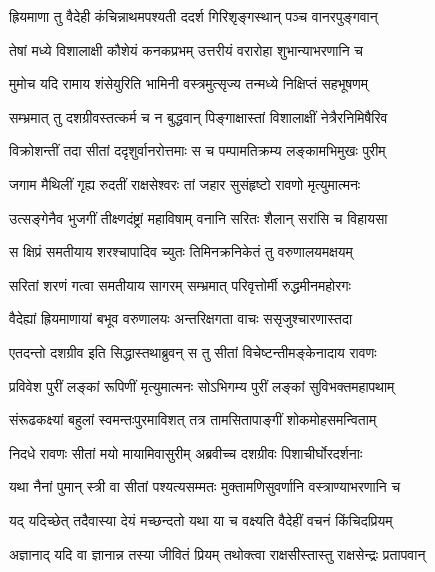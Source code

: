 
\twolineshloka
{ह्रियमाणा तु वैदेही कंचिन्नाथमपश्यती}
{ददर्श गिरिशृङ्गस्थान् पञ्च वानरपुङ्गवान्} %

\twolineshloka
{तेषां मध्ये विशालाक्षी कौशेयं कनकप्रभम्}
{उत्तरीयं वरारोहा शुभान्याभरणानि च} %

\twolineshloka
{मुमोच यदि रामाय शंसेयुरिति भामिनी}
{वस्त्रमुत्सृज्य तन्मध्ये निक्षिप्तं सहभूषणम्} %

\twolineshloka
{सम्भ्रमात् तु दशग्रीवस्तत्कर्म च न बुद्धवान्}
{पिङ्गाक्षास्तां विशालाक्षीं नेत्रैरनिमिषैरिव} %

\twolineshloka
{विक्रोशन्तीं तदा सीतां ददृशुर्वानरोत्तमाः}
{स च पम्पामतिक्रम्य लङ्कामभिमुखः पुरीम्} %

\twolineshloka
{जगाम मैथिलीं गृह्य रुदतीं राक्षसेश्वरः}
{तां जहार सुसंहृष्टो रावणो मृत्युमात्मनः} %

\twolineshloka
{उत्सङ्गेनैव भुजगीं तीक्ष्णदंष्ट्रां महाविषाम्}
{वनानि सरितः शैलान् सरांसि च विहायसा} %

\twolineshloka
{स क्षिप्रं समतीयाय शरश्चापादिव च्युतः}
{तिमिनक्रनिकेतं तु वरुणालयमक्षयम्} %

\twolineshloka
{सरितां शरणं गत्वा समतीयाय सागरम्}
{सम्भ्रमात् परिवृत्तोर्मी रुद्धमीनमहोरगः} %

\twolineshloka
{वैदेह्यां ह्रियमाणायां बभूव वरुणालयः}
{अन्तरिक्षगता वाचः ससृजुश्चारणास्तदा} %

\twolineshloka
{एतदन्तो दशग्रीव इति सिद्धास्तथाब्रुवन्}
{स तु सीतां विचेष्टन्तीमङ्केनादाय रावणः} %

\twolineshloka
{प्रविवेश पुरीं लङ्कां रूपिणीं मृत्युमात्मनः}
{सोऽभिगम्य पुरीं लङ्कां सुविभक्तमहापथाम्} %

\twolineshloka
{संरूढकक्ष्यां बहुलां स्वमन्तःपुरमाविशत्}
{तत्र तामसितापाङ्गीं शोकमोहसमन्विताम्} %

\twolineshloka
{निदधे रावणः सीतां मयो मायामिवासुरीम्}
{अब्रवीच्च दशग्रीवः पिशाचीर्घोरदर्शनाः} %

\twolineshloka
{यथा नैनां पुमान् स्त्री वा सीतां पश्यत्यसम्मतः}
{मुक्तामणिसुवर्णानि वस्त्राण्याभरणानि च} %

\twolineshloka
{यद् यदिच्छेत् तदैवास्या देयं मच्छन्दतो यथा}
{या च वक्ष्यति वैदेहीं वचनं किंचिदप्रियम्} %

\twolineshloka
{अज्ञानाद् यदि वा ज्ञानान्न तस्या जीवितं प्रियम्}
{तथोक्त्वा राक्षसीस्तास्तु राक्षसेन्द्रः प्रतापवान्} %

